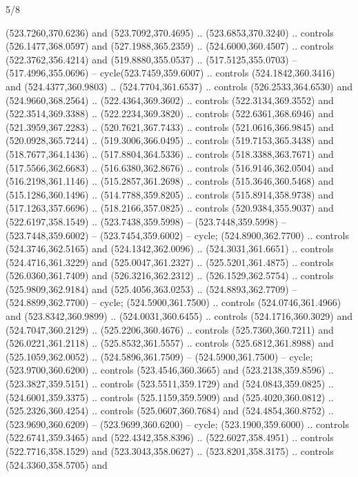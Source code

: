 \begin{flagdescription}{5/8}
\begin{scope}[shift={(0.5\flaglength,0.5\flagwidth)},scale=\flagwidth*\stretchfactor/820]
\begin{scope}[scale=1.84,xshift=-135mm,yshift=84mm]
\begin{scope}[y=0.80pt, x=0.80pt, yscale=-1, xscale=1]
\begin{scope}[cm={{1.01416,0.0,0.0,1.033,(-6.79641,-9.89449)}}]
\begin{scope}[draw=c6c301e,fill=cfab81c,line width=0.087\lw]
  (523.7260,370.6236) and (523.7092,370.4695) .. (523.6853,370.3240) .. controls
  (526.1477,368.0597) and (527.1988,365.2359) .. (524.6000,360.4507) .. controls
  (522.3762,356.4214) and (519.8880,355.0537) .. (517.5125,355.0703) --
  (517.4996,355.0696) -- cycle(523.7459,359.6007) .. controls
  (524.1842,360.3416) and (524.4377,360.9803) .. (524.7704,361.6537) .. controls
  (526.2533,364.6530) and (524.9660,368.2564) .. (522.4364,369.3602) .. controls
  (522.3134,369.3552) and (522.3514,369.3388) .. (522.2234,369.3820) .. controls
  (522.6361,368.6946) and (521.3959,367.2283) .. (520.7621,367.7433) .. controls
  (521.0616,366.9845) and (520.0928,365.7244) .. (519.3006,366.0495) .. controls
  (519.7153,365.3438) and (518.7677,364.1436) .. (517.8804,364.5336) .. controls
  (518.3388,363.7671) and (517.5566,362.6683) .. (516.6380,362.8676) .. controls
  (516.9146,362.0504) and (516.2198,361.1146) .. (515.2857,361.2698) .. controls
  (515.3646,360.5468) and (515.1286,360.1496) .. (514.7788,359.8205) .. controls
  (515.8914,358.9738) and (517.1263,357.6696) .. (518.2166,357.0825) .. controls
  (520.9384,355.9037) and (522.6197,358.1549) .. (523.7438,359.5998) --
  (523.7448,359.5998) -- (523.7448,359.6002) -- (523.7454,359.6002) -- cycle;
 (524.8900,362.7700) .. controls (524.3746,362.5165) and
  (524.1342,362.0096) .. (524.3031,361.6651) .. controls (524.4716,361.3229) and
  (525.0047,361.2327) .. (525.5201,361.4875) .. controls (526.0360,361.7409) and
  (526.3216,362.2312) .. (526.1529,362.5754) .. controls (525.9809,362.9184) and
  (525.4056,363.0253) .. (524.8893,362.7709) -- (524.8899,362.7700) -- cycle;
 (524.5900,361.7500) .. controls (524.0746,361.4966) and
  (523.8342,360.9899) .. (524.0031,360.6455) .. controls (524.1716,360.3029) and
  (524.7047,360.2129) .. (525.2206,360.4676) .. controls (525.7360,360.7211) and
  (526.0221,361.2118) .. (525.8532,361.5557) .. controls (525.6812,361.8988) and
  (525.1059,362.0052) .. (524.5896,361.7509) -- (524.5900,361.7500) -- cycle;
 (523.9700,360.6200) .. controls (523.4546,360.3665) and
  (523.2138,359.8596) .. (523.3827,359.5151) .. controls (523.5511,359.1729) and
  (524.0843,359.0825) .. (524.6001,359.3375) .. controls (525.1159,359.5909) and
  (525.4020,360.0812) .. (525.2326,360.4254) .. controls (525.0607,360.7684) and
  (524.4854,360.8752) .. (523.9690,360.6209) -- (523.9699,360.6200) -- cycle;
 (523.1900,359.6000) .. controls (522.6741,359.3465) and
  (522.4342,358.8396) .. (522.6027,358.4951) .. controls (522.7716,358.1529) and
  (523.3043,358.0627) .. (523.8201,358.3175) .. controls (524.3360,358.5705) and

\end{scope}
\end{scope}
\end{scope}
\end{scope}
\end{scope}
\end{flagdescription}

